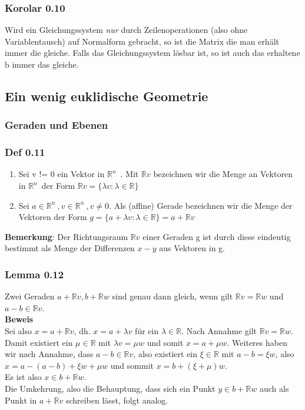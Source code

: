 \documentclass{article}
\newcommand{\lb}{\lambda}
\newcommand{\R}{\mathbb{R}}
\newcommand{\Rn}{\mathbb{R}^n\ }
\newcommand{\mRn}{$\mathbb{R}^n$\ }
\begin{document}
\subsubsection{Korolar 0.10}
Wird ein Gleichungssystem \textit{nur} durch Zeilenoperationen (also ohne Variablentausch) auf Normalform gebracht, so ist die Matrix die man erhält immer die gleiche. Falls das Gleichungssystem lösbar ist, so ist auch das erhaltene b immer das gleiche.

\subsection{Ein wenig euklidische Geometrie}

\subsubsection{Geraden und Ebenen}
\subsubsection{Def 0.11}
\begin{enumerate}
\item{
Sei v != 0 ein Vektor in \mRn. Mit $\R v$ bezeichnen wir die Menge an Vektoren in \mRn der Form $\R v = \{\lb v : \lb \in \R\}$}
\item{
Sei $a \in \Rn, v \in \Rn, v \neq 0$. Als (affine) Gerade bezeichnen wir die Menge der Vektoren der Form $g = \{a + \lb v : \lb \in \R\} = a + \R v$
}
\end{enumerate}
\textbf{Bemerkung}: Der Richtungsraum $\R v$ einer Geraden g ist durch diese eindeutig bestimmt als Menge der Differenzen $x - y$ aus Vektoren in g.\\

\subsubsection{Lemma 0.12}
Zwei Geraden $a + \R v, b + \R w$ sind genau dann gleich, wenn gilt $\R v = \R w$ und $a - b \in \R v$.\\
\textbf{Beweis}\\
Sei also  $x = a + \R v$, dh. $x = a + \lb v$ für ein $\lb \in \R$. Nach Annahme gilt $\R v = \R w$. Damit existiert ein $\mu \in \R$ mit $\lb v = \mu w$ und somit $x = a + \mu w$. Weiteres haben wir nach Annahme, dass $a-b \in \R v$, also existiert ein $\xi \in \R$ mit $a - b = \xi w$, also $x = a - (a - b) + \xi w + \mu w$ und sommit $x = b + (\xi + \mu) w$.\\
Es ist also $x \in b + \R w$.\\
Die Umkehrung, also die Behauptung, dass sich ein Punkt $y \in b + \R w$ auch als Punkt in $a + \R v$ schreiben lässt, folgt analog.\\
\end{document}
